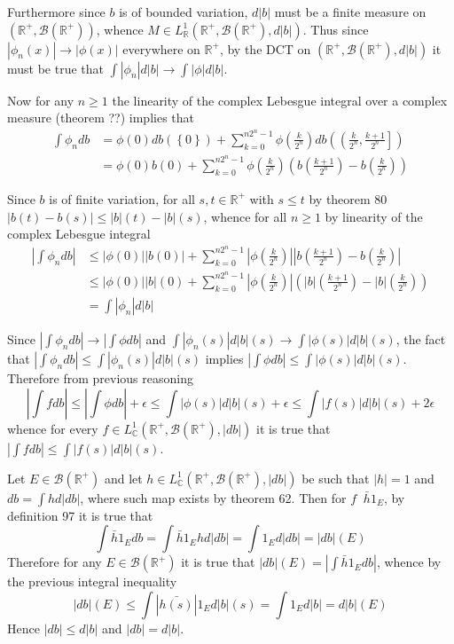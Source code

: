 \documentclass[a4paper]{article}
\newcommand{\obj}[1]{\left\{ #1 \right \}}
\newcommand{\ploc}[1]{\left ( #1 \right ]}
\newcommand{\brac}[1]{\left ( #1 \right )}
\newcommand{\abs}[1]{\left | #1 \right |}
\newcommand{\Real}{\mathbb{R}}
\newcommand{\Cplx}{\mathbb{C}}
\newcommand{\borel}[1]{\mathcal{B}\brac{#1}}
\newcommand{\defn}{\mathop{\overset{\Delta}{=}}\nolimits}
\begin{document}
Furthermore since $b$ is of bounded variation, $d\abs{b}$ must be a finite measure on $\brac{\Real^+, \borel{\Real^+}}$, whence $M\in L^1_\Real\brac{\Real^+, \borel{\Real^+}, d\abs{b}}$. Thus since $\abs{\phi_n\brac{x}}\to\abs{\phi\brac{x}}$ everywhere on $\Real^+$, by the DCT on $\brac{\Real^+, \borel{\Real^+}, d\abs{b}}$ it must be true that $\int \abs{\phi_n} d\abs{b} \to \int \abs{\phi} d\abs{b}$.

Now for any $n\geq1$ the linearity of the complex Lebesgue integral over a complex measure (theorem ??) implies that \begin{align*}\int \phi_n db &= \phi\brac{0} db\brac{\obj{0}}+\sum_{k=0}^{n 2^n-1} \phi\brac{\frac{k}{2^n}} db\brac{\ploc{ \frac{k}{2^n}, \frac{k+1}{2^n} }} \\&= \phi\brac{0} b\brac{0} + \sum_{k=0}^{n 2^n-1} \phi\brac{\frac{k}{2^n}} \brac{ b\brac{\frac{k+1}{2^n}} - b\brac{\frac{k}{2^n}} } \end{align*}

Since $b$ is of finite variation, for all $s,t\in \Real^+$ with $s\leq t$ by theorem 80 $\abs{b\brac{t}-b\brac{s}} \leq \abs{b}\brac{t}-\abs{b}\brac{s}$, whence for all $n\geq1$ by linearity of the complex Lebesgue integral \begin{align*}\abs{\int \phi_n db} &\leq \abs{\phi\brac{0}} \abs{b\brac{0}} + \sum_{k=0}^{n 2^n-1} \abs{\phi\brac{\frac{k}{2^n}}} \abs{ b\brac{\frac{k+1}{2^n}} - b\brac{\frac{k}{2^n}} }\\&\leq \abs{\phi\brac{0}} \abs{b}\brac{0} + \sum_{k=0}^{n 2^n-1} \abs{\phi\brac{\frac{k}{2^n}}} \brac{ \abs{b}\brac{\frac{k+1}{2^n}} - \abs{b}\brac{\frac{k}{2^n}} }\\&=\int \abs{\phi_n} d\abs{b}\end{align*}

Since $\abs{\int \phi_n db} \to \abs{\int \phi db}$ and $\int \abs{\phi_n\brac{s}} d\abs{b}\brac{s} \to \int \abs{\phi\brac{s}} d\abs{b}\brac{s}$, the fact that $\abs{\int \phi_n db}\leq \int \abs{\phi_n\brac{s}} d\abs{b}\brac{s}$ implies $\abs{\int \phi db}\leq \int \abs{\phi\brac{s}} d\abs{b}\brac{s}$. Therefore from previous reasoning \[\abs{ \int f db } \leq \abs{ \int \phi db } + \epsilon \leq \int \abs{\phi\brac{s}} d\abs{b}\brac{s} + \epsilon \leq \int \abs{f\brac{s}} d\abs{b}\brac{s} + 2\epsilon\] whence for every $f\in L^1_\Cplx\brac{\Real^+, \borel{\Real^+}, \abs{db}}$ it is true that $\abs{ \int f db } \leq \int \abs{f\brac{s}} d\abs{b}\brac{s}$.

Let $E\in \borel{\Real^+}$ and let $h\in L^1_\Cplx\brac{\Real^+, \borel{\Real^+}, \abs{db}}$ be such that $\abs{h}=1$ and $db = \int h d\abs{db}$, where such map exists by theorem 62. Then for $f\defn \bar{h} 1_E$, by definition 97 it is true that \[\int \bar{h} 1_E db = \int \bar{h} 1_E h d\abs{db} = \int 1_E d\abs{db} = \abs{db}\brac{E}\] Therefore for any $E\in \borel{\Real^+}$ it is true that $\abs{db}\brac{E} = \abs{\int \bar{h} 1_E db}$, whence by the previous integral inequality \[\abs{db}\brac{E} \leq \int \abs{\bar{h\brac{s}}} 1_E d\abs{b}\brac{s} = \int 1_E d\abs{b} = d\abs{b}\brac{E} \] Hence $\abs{db}\leq d\abs{b}$ and $\abs{db}=d\abs{b}$.\\
\end{document}
